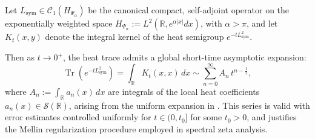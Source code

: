 \begin{lemma}
\label{lem:heat_trace_expansion}
Let \( L_{\mathrm{sym}} \in \mathcal{C}_1(H_{\Psi_\alpha}) \) be the canonical compact, self-adjoint operator on the exponentially weighted space \( H_{\Psi_\alpha} := L^2(\mathbb{R}, e^{\alpha |x|} dx) \), with \( \alpha > \pi \), and let \( K_t(x, y) \) denote the integral kernel of the heat semigroup \( e^{-t L_{\mathrm{sym}}^2} \).

Then as \( t \to 0^+ \), the heat trace admits a global short-time asymptotic expansion:
\[
\operatorname{Tr}(e^{-t L_{\mathrm{sym}}^2}) = \int_{\mathbb{R}} K_t(x,x)\, dx \sim \sum_{n=0}^\infty A_n\, t^{n - \frac{1}{2}},
\]
where \( A_n := \int_{\mathbb{R}} a_n(x)\, dx \) are integrals of the local heat coefficients \( a_n(x) \in \mathcal{S}(\mathbb{R}) \), arising from the uniform expansion in . This series is valid with error estimates controlled uniformly for \( t \in (0, t_0] \) for some \( t_0 > 0 \), and justifies the Mellin regularization procedure employed in spectral zeta analysis.
\end{lemma}
